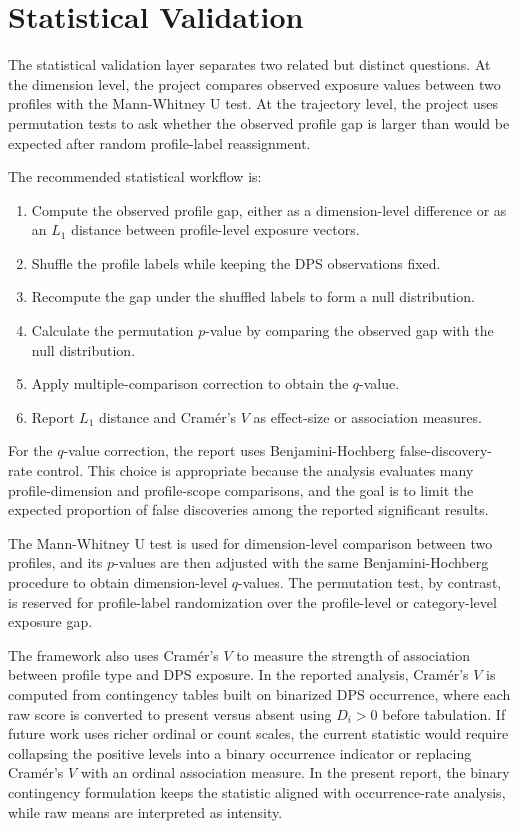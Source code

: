 \section{Statistical Validation}

The statistical validation layer separates two related but distinct questions.
At the dimension level, the project compares observed exposure values between two profiles with the Mann-Whitney U test.
At the trajectory level, the project uses permutation tests to ask whether the observed profile gap is larger than would be expected after random profile-label reassignment.

The recommended statistical workflow is:
\begin{enumerate}
    \item Compute the observed profile gap, either as a dimension-level difference or as an \(L_1\) distance between profile-level exposure vectors.
    \item Shuffle the profile labels while keeping the DPS observations fixed.
    \item Recompute the gap under the shuffled labels to form a null distribution.
    \item Calculate the permutation \(p\)-value by comparing the observed gap with the null distribution.
    \item Apply multiple-comparison correction to obtain the \(q\)-value.
    \item Report \(L_1\) distance and Cramér's \(V\) as effect-size or association measures.
\end{enumerate}

For the \(q\)-value correction, the report uses Benjamini-Hochberg false-discovery-rate control. This choice is appropriate because the analysis evaluates many profile-dimension and profile-scope comparisons, and the goal is to limit the expected proportion of false discoveries among the reported significant results.

The Mann-Whitney U test is used for dimension-level comparison between two profiles, and its \(p\)-values are then adjusted with the same Benjamini-Hochberg procedure to obtain dimension-level \(q\)-values. The permutation test, by contrast, is reserved for profile-label randomization over the profile-level or category-level exposure gap.

The framework also uses Cramér's \(V\) to measure the strength of association between profile type and DPS exposure. In the reported analysis, Cramér's \(V\) is computed from contingency tables built on binarized DPS occurrence, where each raw score is converted to present versus absent using \(D_i>0\) before tabulation. If future work uses richer ordinal or count scales, the current statistic would require collapsing the positive levels into a binary occurrence indicator or replacing Cramér's \(V\) with an ordinal association measure. In the present report, the binary contingency formulation keeps the statistic aligned with occurrence-rate analysis, while raw means are interpreted as intensity.

